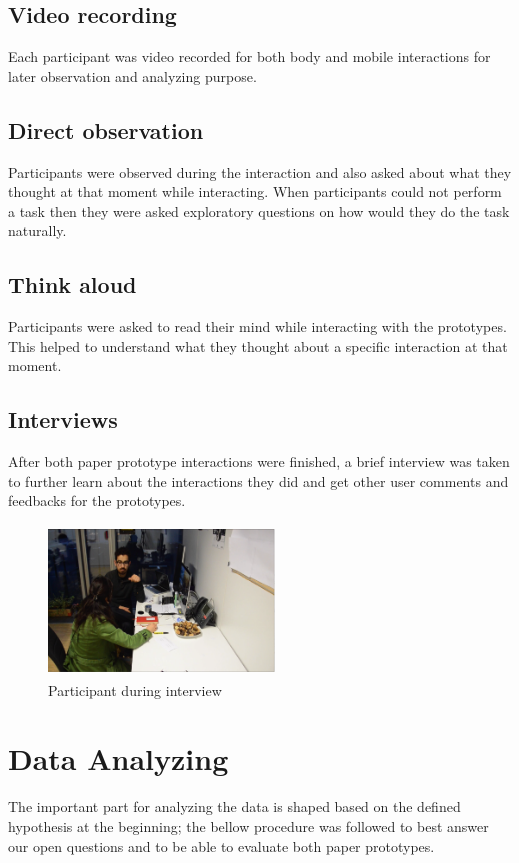 \subsection{Video recording}
Each participant was video recorded for both body and mobile interactions for later observation and analyzing purpose. 

\subsection{Direct observation}
Participants were observed during the interaction and also asked about what they thought at that moment while interacting. When participants could not perform a task then they were asked exploratory questions on how would they do the task naturally.

\subsection{Think aloud}
Participants were asked to read their mind while interacting with the prototypes. This helped to understand what they thought about a specific interaction at that moment. 

\subsection{Interviews}
	After both paper prototype interactions were finished, a brief interview was taken to further learn about the interactions they did and get other user comments and feedbacks for the prototypes.



\begin{figure}[H]
\centering
\includegraphics[width=6cm,height=4cm]{Figures/5/interview_pic}%
 \caption{Participant during interview }%
 \label{fig:interview_pic}%
\end{figure}



\section{Data Analyzing}
The important part for analyzing the data is shaped based on the defined hypothesis at the beginning; the bellow procedure was followed to best answer our open questions and to be able to evaluate both paper prototypes. 


